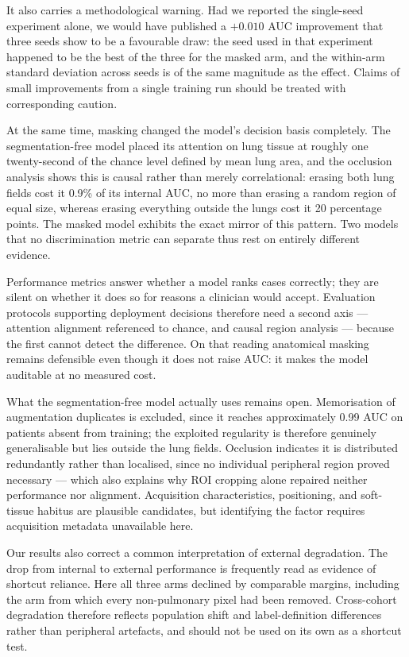 \documentclass[journal,twoside,web]{ieeecolor}
\begin{document}
It also carries a methodological warning. Had we reported the single-seed experiment alone, we would have published a $+0.010$ AUC improvement that three seeds show to be a favourable draw: the seed used in that experiment happened to be the best of the three for the masked arm, and the within-arm standard deviation across seeds is of the same magnitude as the effect. Claims of small improvements from a single training run should be treated with corresponding caution.

At the same time, masking changed the model's decision basis completely. The segmentation-free model placed its attention on lung tissue at roughly one twenty-second of the chance level defined by mean lung area, and the occlusion analysis shows this is causal rather than merely correlational: erasing both lung fields cost it 0.9\% of its internal AUC, no more than erasing a random region of equal size, whereas erasing everything outside the lungs cost it 20 percentage points. The masked model exhibits the exact mirror of this pattern. Two models that no discrimination metric can separate thus rest on entirely different evidence.

Performance metrics answer whether a model ranks cases correctly; they are silent on whether it does so for reasons a clinician would accept. Evaluation protocols supporting deployment decisions therefore need a second axis --- attention alignment referenced to chance, and causal region analysis --- because the first cannot detect the difference. On that reading anatomical masking remains defensible even though it does not raise AUC: it makes the model auditable at no measured cost.

What the segmentation-free model actually uses remains open. Memorisation of augmentation duplicates is excluded, since it reaches approximately 0.99 AUC on patients absent from training; the exploited regularity is therefore genuinely generalisable but lies outside the lung fields. Occlusion indicates it is distributed redundantly rather than localised, since no individual peripheral region proved necessary --- which also explains why ROI cropping alone repaired neither performance nor alignment. Acquisition characteristics, positioning, and soft-tissue habitus are plausible candidates, but identifying the factor requires acquisition metadata unavailable here.

Our results also correct a common interpretation of external degradation. The drop from internal to external performance is frequently read as evidence of shortcut reliance. Here all three arms declined by comparable margins, including the arm from which every non-pulmonary pixel had been removed. Cross-cohort degradation therefore reflects population shift and label-definition differences rather than peripheral artefacts, and should not be used on its own as a shortcut test.
\end{document}

